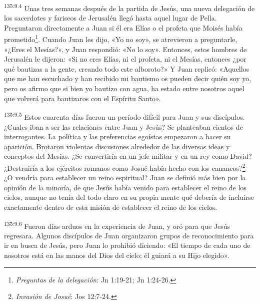 \par
\textsuperscript{135:9.4} Unas tres semanas después de la partida de Jesús, una nueva delegación de los sacerdotes y fariseos de Jerusalén llegó hasta aquel lugar de Pella. Preguntaron directamente a Juan si él era Elías o el profeta que Moisés había prometido\footnote{\textit{Preguntas de la delegación}: Jn 1:19-21; Jn 1:24-26.}. Cuando Juan les dijo, «Yo no soy», se atrevieron a preguntarle, «¿Eres el Mesías?», y Juan respondió: «No lo soy». Entonces, estos hombres de Jerusalén le dijeron: «Si no eres Elías, ni el profeta, ni el Mesías, entonces ¿por qué bautizas a la gente, creando todo este alboroto?» Y Juan replicó: «Aquellos que me han escuchado y han recibido mi bautismo os pueden decir quién soy yo, pero os afirmo que si bien yo bautizo con agua, ha estado entre nosotros aquel que volverá para bautizaros con el Espíritu Santo».

\par
\textsuperscript{135:9.5} Estos cuarenta días fueron un período difícil para Juan y sus discípulos. ¿Cuales iban a ser las relaciones entre Juan y Jesús? Se planteaban cientos de interrogantes. La política y las preferencias egoístas empezaron a hacer su aparición. Brotaron violentas discusiones alrededor de las diversas ideas y conceptos del Mesías. ¿Se convertiría en un jefe militar y en un rey como David? ¿Destruiría a los ejércitos romanos como Josué había hecho con los cananeos?\footnote{\textit{Invasión de Josué}: Jos 12:7-24.} ¿O vendría para establecer un reino espiritual? Juan se definió más bien por la opinión de la minoría, de que Jesús había venido para establecer el reino de los cielos, aunque no tenía del todo claro en su propia mente qué debería de incluirse exactamente dentro de esta misión de establecer el reino de los cielos.

\par
\textsuperscript{135:9.6} Fueron días arduos en la experiencia de Juan, y oró para que Jesús regresara. Algunos discípulos de Juan organizaron grupos de reconocimiento para ir en busca de Jesús, pero Juan lo prohibió diciendo: «El tiempo de cada uno de nosotros está en las manos del Dios del cielo; él guiará a su Hijo elegido».

